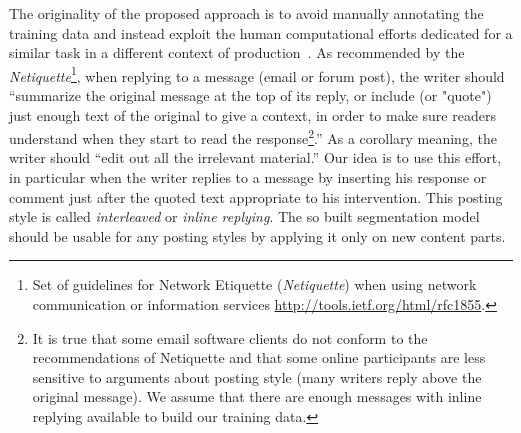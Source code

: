 The originality of the proposed approach is to avoid manually annotating the training data and instead exploit the human computational efforts dedicated for a similar task in a different context of production~\cite{ahn:2006:computer}. 
% 
As recommended by the \textit{Netiquette}\footnote{Set of guidelines for Network Etiquette (\textit{Netiquette}) when using network communication or information services \url{http://tools.ietf.org/html/rfc1855}.}, when replying to a message (email or forum post), the writer should 
 ``summarize the original message at the top of its reply, %
or include (or "quote") just enough text of the original to give a context, in order to make sure readers understand when they start to read the response\footnote{It is true that some email software clients do not conform to the recommendations of Netiquette and that some online participants are less sensitive to arguments about posting style (many writers reply above  the original message).
We assume that there are enough messages with inline replying available to build our training data.}.''  As a corollary meaning, the writer should ``edit out all the irrelevant material.''
%
Our idea is to use this effort, in particular when the writer replies to a message by inserting his response or comment just after the quoted text appropriate to his intervention. 
%
This posting style is called \textit{interleaved} or \textit{inline replying}.
%
%
The so built segmentation model should be usable for any posting styles by applying it only on new content parts.


